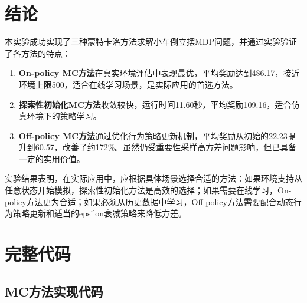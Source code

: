 \documentclass[12pt,a4paper]{article}
\begin{document}
\section{结论}

本实验成功实现了三种蒙特卡洛方法求解小车倒立摆MDP问题，并通过实验验证了各方法的特点：

\begin{enumerate}
    \item \textbf{On-policy MC方法}在真实环境评估中表现最优，平均奖励达到486.17，接近环境上限500，适合在线学习场景，是实际应用的首选方法。
    
    \item \textbf{探索性初始化MC方法}收敛较快，运行时间11.60秒，平均奖励109.16，适合仿真环境下的策略学习。
    
    \item \textbf{Off-policy MC方法}通过优化行为策略更新机制，平均奖励从初始的22.23提升到60.57，改善了约172\%。虽然仍受重要性采样高方差问题影响，但已具备一定的实用价值。
\end{enumerate}

实验结果表明，在实际应用中，应根据具体场景选择合适的方法：如果环境支持从任意状态开始模拟，探索性初始化方法是高效的选择；如果需要在线学习，On-policy方法更为合适；如果必须从历史数据中学习，Off-policy方法需要配合动态行为策略更新和适当的epsilon衰减策略来降低方差。

\newpage

\newpage

\appendix

\section{完整代码}

\subsection{MC方法实现代码}
\end{document}
